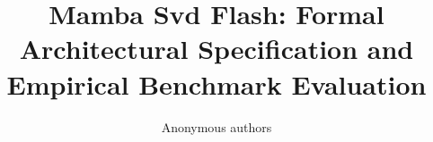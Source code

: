 \title{\textbf{Mamba Svd Flash: Formal Architectural Specification and Empirical Benchmark Evaluation}}

\author{Anonymous authors}
